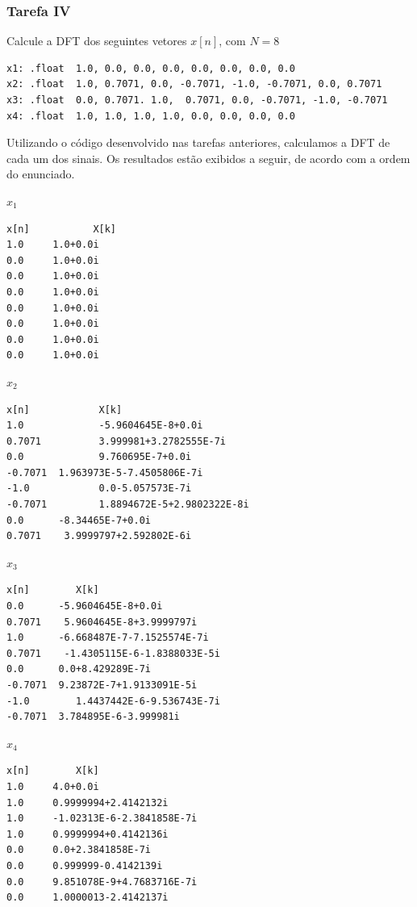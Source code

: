 \documentclass[a4paper,12pt]{article}
\begin{document}
\subsubsection{Tarefa IV}
\begin{tcolorbox}[title=Enunciado, colback=blue!5!white, colframe=blue!75!black]
Calcule a DFT dos seguintes vetores $x[n]$, com $N=8$
\begin{verbatim}
x1: .float  1.0, 0.0, 0.0, 0.0, 0.0, 0.0, 0.0, 0.0 
x2: .float  1.0, 0.7071, 0.0, -0.7071, -1.0, -0.7071, 0.0, 0.7071 
x3: .float  0.0, 0.7071. 1.0,  0.7071, 0.0, -0.7071, -1.0, -0.7071 
x4: .float  1.0, 1.0, 1.0, 1.0, 0.0, 0.0, 0.0, 0.0 
\end{verbatim}
\end{tcolorbox}
Utilizando o código desenvolvido nas tarefas anteriores, calculamos a DFT de cada um dos sinais. Os resultados estão exibidos a seguir, de acordo com a ordem do enunciado.

\begin{multicols}{2}
    \begin{codebox}{$x_1$}
    \begin{verbatim}
x[n]           X[k]
1.0	    1.0+0.0i
0.0	    1.0+0.0i
0.0	    1.0+0.0i
0.0	    1.0+0.0i
0.0	    1.0+0.0i
0.0	    1.0+0.0i
0.0	    1.0+0.0i
0.0	    1.0+0.0i
    \end{verbatim}
    \end{codebox}
    
    \begin{codebox}{$x_2$}
    \begin{verbatim}
x[n]            X[k]
1.0             -5.9604645E-8+0.0i
0.7071          3.999981+3.2782555E-7i
0.0             9.760695E-7+0.0i
-0.7071	 1.963973E-5-7.4505806E-7i
-1.0            0.0-5.057573E-7i
-0.7071         1.8894672E-5+2.9802322E-8i
0.0	     -8.34465E-7+0.0i
0.7071	  3.9999797+2.592802E-6i
    \end{verbatim}
    \end{codebox}
\columnbreak
    \begin{codebox}{$x_3$}
    \begin{verbatim}
x[n]	    X[k]
0.0	     -5.9604645E-8+0.0i
0.7071	  5.9604645E-8+3.9999797i
1.0	     -6.668487E-7-7.1525574E-7i
0.7071	  -1.4305115E-6-1.8388033E-5i
0.0	     0.0+8.429289E-7i
-0.7071	 9.23872E-7+1.9133091E-5i
-1.0	    1.4437442E-6-9.536743E-7i
-0.7071	 3.784895E-6-3.999981i
    \end{verbatim}
    \end{codebox}
    
    \begin{codebox}{$x_4$}
    \begin{verbatim}
x[n]	    X[k]
1.0	    4.0+0.0i
1.0	    0.9999994+2.4142132i
1.0	    -1.02313E-6-2.3841858E-7i
1.0	    0.9999994+0.4142136i
0.0	    0.0+2.3841858E-7i
0.0	    0.999999-0.4142139i
0.0	    9.851078E-9+4.7683716E-7i
0.0	    1.0000013-2.4142137i
    \end{verbatim}
    \end{codebox}
\end{multicols}
\end{document}
